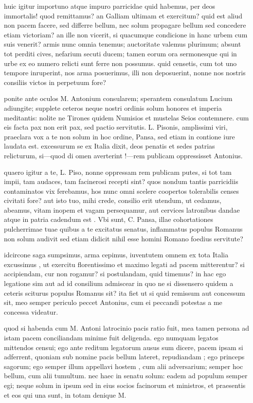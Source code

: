 huic igitur importuno atque impuro parricidae quid habemus, per deos immortalis! quod remittamus? an Galliam ultimam et exercitum? quid est aliud non pacem facere, sed differre bellum, nec solum propagare bellum sed concedere etiam victoriam? an ille non vicerit, si quacumque condicione in hanc urbem cum suis venerit? armis nunc omnia tenemus; auctoritate valemus plurimum; absunt tot perditi cives, nefarium secuti ducem; tamen eorum ora sermonesque qui in urbe ex eo numero relicti sunt ferre non possumus. quid censetis, cum tot uno tempore inruperint, nos arma posuerimus, illi non deposuerint, nonne nos nostris consiliis victos in perpetuum fore?

 ponite ante oculos M. Antonium consularem; sperantem consulatum Lucium adiungite; supplete ceteros neque nostri ordinis solum honores et imperia meditantis: nolite ne Tirones quidem Numisios et mustelas Seios contemnere. cum eis facta pax non erit pax, sed pactio servitutis. L. Pisonis, amplissimi viri, praeclara vox a te non solum in hoc ordine, Pansa, sed etiam in contione iure laudata est. excessurum se ex Italia dixit, deos penatis et sedes patrias relicturum, si—quod di omen averterint !—rem publicam oppressisset Antonius.

 quaero igitur a te, L. Piso, nonne oppressam rem publicam putes, si tot tam impii, tam audaces, tam facinerosi recepti sint? quos nondum tantis parricidiis contaminatos vix ferebamus, hos nunc omni scelere coopertos tolerabilis censes civitati fore? aut isto tuo, mihi crede, consilio erit utendum, ut cedamus, abeamus, vitam inopem et vagam persequamur, aut cervices latronibus dandae atque in patria cadendum est . Vbi sunt, C. Pansa, illae cohortationes pulcherrimae tuae quibus a te excitatus senatus, inflammatus populus Romanus non solum audivit sed etiam didicit nihil esse homini Romano foedius servitute?

 idcircone saga sumpsimus, arma cepimus, iuventutem omnem ex tota Italia excussimus , ut exercitu florentissimo et maximo legati ad pacem mitterentur? si accipiendam, cur non rogamur? si postulandam, quid timemus? in hac ego legatione sim aut ad id consilium admiscear in quo ne si dissensero quidem a ceteris sciturus populus Romanus sit? ita fiet ut si quid remissum aut concessum sit, meo semper periculo peccet Antonius, cum ei peccandi potestas a me concessa videatur.

 quod si habenda cum M. Antoni latrocinio pacis ratio fuit, mea tamen persona ad istam pacem conciliandam minime fuit deligenda. ego numquam legatos mittendos censui; ego ante reditum legatorum ausus sum dicere, pacem ipsam si adferrent, quoniam sub nomine pacis bellum lateret, repudiandam ; ego princeps sagorum; ego semper illum appellavi hostem , cum alii adversarium; semper hoc bellum, cum alii tumultum. nec haec in senatu solum: eadem ad populum semper egi; neque solum in ipsum sed in eius socios facinorum et ministros, et praesentis et eos qui una sunt, in totam denique M.

